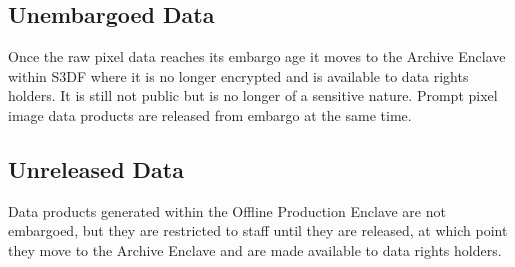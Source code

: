 \subsection{Unembargoed Data}
Once the raw pixel data reaches its embargo age it moves to the Archive \gls{Enclave} within \gls{S3DF} where it is no longer encrypted and is available to data rights holders. It is still not public but is no longer of a sensitive nature.
Prompt pixel image data products are released from embargo at the same time.

\subsection{Unreleased Data}
Data products generated within the Offline Production \gls{Enclave} are not embargoed, but they are restricted to staff until they are released, at which point they move to the Archive \gls{Enclave} and are made available to data rights holders.
